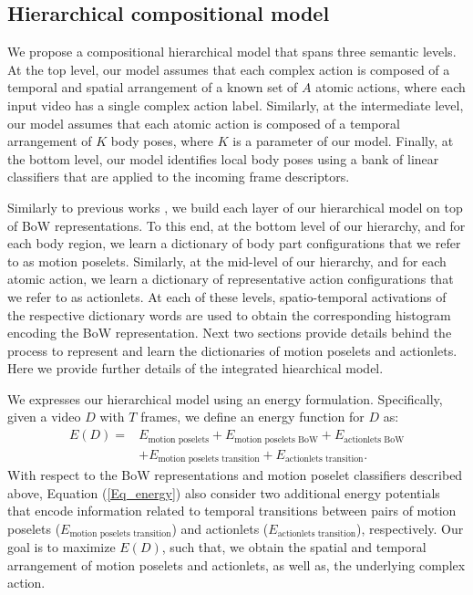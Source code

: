 \subsection{Hierarchical compositional model}

We propose a compositional hierarchical model that spans three semantic levels. 
At the top level, our model assumes that each complex action is composed of a 
temporal and spatial arrangement of a known set of $A$ atomic actions, where 
each input video has a single complex action label. Similarly, at the 
intermediate level, our model assumes that each atomic action is composed of a 
temporal arrangement of $K$ body poses, where $K$ is a parameter of 
our model. Finally, at the bottom level, our model identifies local body poses 
using a bank of linear classifiers that are applied to the incoming frame 
descriptors. 

Similarly to previous works \cite{Lillo2014, Taralova:EtAl:2014}, we build 
each layer of our hierarchical model on top of BoW 
representations. To this end, at the bottom level of our hierarchy, and for 
each body region, we learn a dictionary of body part configurations that we 
refer to as motion poselets. Similarly, at the mid-level of our hierarchy, and 
for each atomic action, we learn a dictionary of representative action 
configurations that we refer to as actionlets. At each of these levels, 
spatio-temporal activations of the respective dictionary words are used 
to obtain the corresponding histogram encoding the BoW representation. 
Next two sections provide 
details behind the process to represent and learn the dictionaries of motion 
poselets and actionlets. Here we provide further details of the 
integrated hiearchical model.

We expresses our hierarchical model using an energy formulation. 
Specifically, given a video $D$ with $T$ frames, we
define an energy function for $D$ as:
{\small
\begin{align}\label{Eq_energy}
E(D) = & E_{\text{motion poselets}} + E_{\text{motion poselets BoW}} + 
E_{\text{actionlets BoW}} \nonumber \\ 
& + E_{\text{motion poselets transition}} + E_{\text{actionlets 
transition}}.
\end{align}}
With respect to the BoW representations and motion poselet classifiers 
described above, Equation (\ref{Eq_energy}) also 
consider two additional energy potentials that encode information related to 
temporal 
transitions between pairs of motion poselets ($E_{\text{motion poselets 
transition}}$) and 
actionlets ($E_{\text{actionlets transition}}$), respectively. Our goal is to 
maximize $E(D)$, such that, we obtain the 
spatial and temporal arrangement 
of motion poselets and actionlets, as well as, the underlying 
complex action. 

